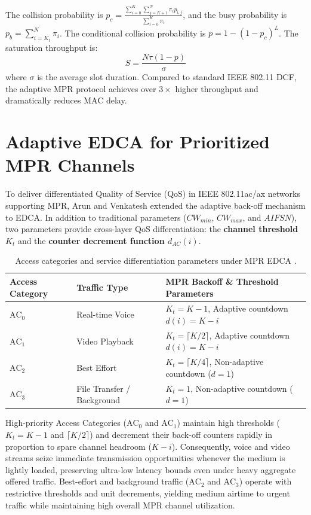 The collision probability is $p_c = \frac{\sum_{i=0}^K \sum_{j=K+1}^N \pi_i p_{i,j}}{\sum_{i=0}^K \pi_i}$, and the busy probability is $p_b = \sum_{i=K_t}^N \pi_i$. The conditional collision probability is $p = 1 - (1 - p_c)^L$. The saturation throughput is:
\begin{equation}
    S = \frac{N \tau (1 - p)}{\sigma}
\end{equation}
where $\sigma$ is the average slot duration. Compared to standard IEEE 802.11 DCF, the adaptive MPR protocol achieves over $3\times$ higher throughput and dramatically reduces MAC delay.

\section{Adaptive EDCA for Prioritized MPR Channels}
To deliver differentiated Quality of Service (QoS) in IEEE 802.11ac/ax networks supporting MPR, Arun and Venkatesh extended the adaptive back-off mechanism to EDCA. In addition to traditional parameters ($CW_{min}$, $CW_{max}$, and $AIFSN$), two parameters provide cross-layer QoS differentiation: the \textbf{channel threshold $K_t$} and the \textbf{counter decrement function $d_{AC}(i)$}.

\begin{table}[htbp]
\centering
\small
\begin{tabular}{|l|l|l|}
\hline
\textbf{Access Category} & \textbf{Traffic Type} & \textbf{MPR Backoff  \& Threshold Parameters} \\ \hline
$\text{AC}_0$ & Real-time Voice & $K_t = K - 1$, Adaptive countdown $d(i) = K - i$ \\ \hline
$\text{AC}_1$ & Video Playback & $K_t = \lceil K / 2 \rceil$, Adaptive countdown $d(i) = K - i$ \\ \hline
$\text{AC}_2$ & Best Effort & $K_t = \lceil K / 4 \rceil$, Non-adaptive countdown ($d = 1$) \\ \hline
$\text{AC}_3$ & File Transfer / Background & $K_t = 1$, Non-adaptive countdown ($d = 1$) \\ \hline
\end{tabular}
\caption{Access categories and service differentiation parameters under MPR EDCA \cite{arun2017design}.}
\label{tab:mpr_edca_parameters}
\end{table}

High-priority Access Categories ($\text{AC}_0$ and $\text{AC}_1$) maintain high thresholds ($K_t = K-1$ and $\lceil K/2 \rceil$) and decrement their back-off counters rapidly in proportion to spare channel headroom ($K - i$). Consequently, voice and video streams seize immediate transmission opportunities whenever the medium is lightly loaded, preserving ultra-low latency bounds even under heavy aggregate offered traffic. Best-effort and background traffic ($\text{AC}_2$ and $\text{AC}_3$) operate with restrictive thresholds and unit decrements, yielding medium airtime to urgent traffic while maintaining high overall MPR channel utilization.

